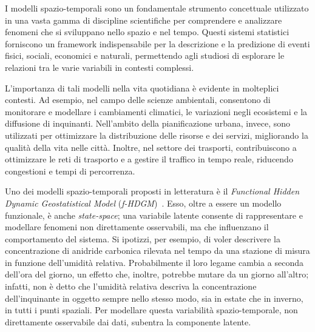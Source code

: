
I modelli spazio-temporali sono un fondamentale strumento concettuale utilizzato in una vasta gamma di discipline scientifiche per comprendere e analizzare fenomeni che si sviluppano nello spazio e nel tempo. Questi sistemi statistici forniscono un framework indispensabile per la descrizione e la predizione di eventi fisici, sociali, economici e naturali, permettendo agli studiosi di esplorare le relazioni tra le varie variabili in contesti complessi.
\par L'importanza di tali modelli nella vita quotidiana è evidente in molteplici contesti. Ad esempio, nel campo delle scienze ambientali, consentono di monitorare e modellare i cambiamenti climatici, le variazioni negli ecosistemi e la diffusione di inquinanti. Nell'ambito della pianificazione urbana, invece, sono utilizzati per ottimizzare la distribuzione delle risorse e dei servizi, migliorando la qualità della vita nelle città. Inoltre, nel settore dei trasporti, contribuiscono a ottimizzare le reti di trasporto e a gestire il traffico in tempo reale, riducendo congestioni e tempi di percorrenza.
\par Uno dei modelli spazio-temporali proposti in letteratura è il \textit{Functional Hidden Dynamic Geostatistical Model} (\textit{f-HDGM})~\citep{paper_f_HDGM}. Esso, oltre a essere un modello funzionale, è anche \textit{state-space}; una variabile latente consente di rappresentare e modellare fenomeni non direttamente osservabili, ma che influenzano il comportamento del sistema. Si ipotizzi, per esempio, di voler descrivere la concentrazione di anidride carbonica rilevata nel tempo da una stazione di misura in funzione dell'umidità relativa. Probabilmente il loro legame cambia a seconda dell'ora del giorno, un effetto che, inoltre, potrebbe mutare da un giorno all'altro; infatti, non è detto che l'umidità relativa descriva la concentrazione dell'inquinante in oggetto sempre nello stesso modo, sia in estate che in inverno, in tutti i punti spaziali. Per modellare questa variabilità spazio-temporale, non direttamente osservabile dai dati, subentra la componente latente.
